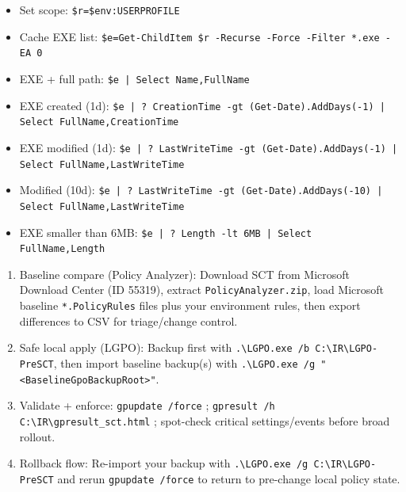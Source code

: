 \documentclass[10pt]{article}
\begin{document}
\begin{tcolorbox}[title=Hunt Recent EXE Files (PowerShell)]
\begin{itemize}[leftmargin=1.1em, itemsep=1pt, topsep=2pt]
  \item Set scope: \verb!$r=$env:USERPROFILE!
  \item Cache EXE list: \verb!$e=Get-ChildItem $r -Recurse -Force -Filter *.exe -EA 0!
  \item EXE + full path: \verb!$e | Select Name,FullName!
  \item EXE created (1d): \verb!$e | ? CreationTime -gt (Get-Date).AddDays(-1) | Select FullName,CreationTime!
  \item EXE modified (1d): \verb!$e | ? LastWriteTime -gt (Get-Date).AddDays(-1) | Select FullName,LastWriteTime!
  \item Modified (10d): \verb!$e | ? LastWriteTime -gt (Get-Date).AddDays(-10) | Select FullName,LastWriteTime!
  \item EXE smaller than 6MB: \verb!$e | ? Length -lt 6MB | Select FullName,Length!
\end{itemize}
\end{tcolorbox}

\begin{tcolorbox}[title=Microsoft Security Compliance Toolkit (SCT) Flows]
\begin{enumerate}[leftmargin=1.2em, itemsep=1pt, topsep=2pt]
  \item Baseline compare (Policy Analyzer): Download SCT from Microsoft Download Center (ID 55319), extract \verb!PolicyAnalyzer.zip!, load Microsoft baseline \verb!*.PolicyRules! files plus your environment rules, then export differences to CSV for triage/change control.
  \item Safe local apply (LGPO): Backup first with \verb!.\LGPO.exe /b C:\IR\LGPO-PreSCT!, then import baseline backup(s) with \verb!.\LGPO.exe /g "<BaselineGpoBackupRoot>"!.
  \item Validate + enforce: \verb!gpupdate /force! ; \verb!gpresult /h C:\IR\gpresult_sct.html! ; spot-check critical settings/events before broad rollout.
  \item Rollback flow: Re-import your backup with \verb!.\LGPO.exe /g C:\IR\LGPO-PreSCT! and rerun \verb!gpupdate /force! to return to pre-change local policy state.
\end{enumerate}
\end{tcolorbox}
\end{document}
